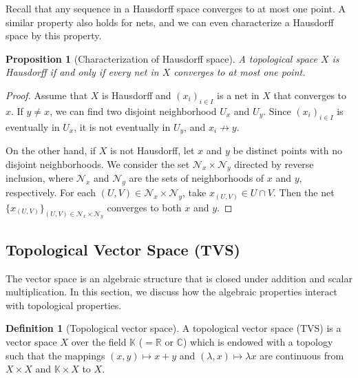 \documentclass{article}
\numberwithin{equation}{section}
\newcommand{\bbC}{\mathbb{C}}
\newcommand{\bbR}{\mathbb{R}}
\theoremstyle{plain}
\newtheorem{proposition}[theorem]{Proposition}
\theoremstyle{definition}
\newtheorem{definition}[theorem]{Definition}
\begin{document}
Recall that any sequence in a Hausdorff space converges to at most one point. A similar property also holds for nets, and we can even characterize a Hausdorff space by this property.
\begin{proposition}[Characterization of Hausdorff space]
A topological space $X$ is Hausdorff if and only if every net in $X$ converges to at most one point.
\end{proposition}
\begin{proof}
Assume that $X$ is Hausdorff and $(x_i)_{i\in I}$ is a net in $X$ that converges to $x$. If $y\neq x$, we can find two disjoint neighborhood $U_x$ and $U_y$. Since $(x_i)_{i\in I}$ is eventually in $U_x$, it is not eventually in $U_y$, and $x_i\not\to y$.

On the other hand, if $X$ is not Hausdorff, let $x$ and $y$ be distinct points with no disjoint neighborhoods. We consider the set $\mathscr{N}_x\times\mathscr{N}_y$ directed by reverse inclusion, where $\mathscr{N}_x$ and $\mathscr{N}_y$ are the sets of neighborhoods of $x$ and $y$, respectively. For each $(U,V)\in\mathscr{N}_x\times\mathscr{N}_y$, take $x_{(U,V)}\in U\cap V$. Then the net $\{x_{(U,V)}\}_{(U,V)\in\mathscr{N}_x\times\mathscr{N}_y}$ converges to both $x$ and $y$.
\end{proof}

\subsection{Topological Vector Space (TVS)}
The vector space is an algebraic structure that is closed under addition and scalar multiplication. In this section, we discuss how the algebraic properties interact with topological properties.
\begin{definition}[Topological vector space]
A topological vector space (TVS) is a vector space $X$ over the field $\mathbb{K}$ ($=\bbR$ or $\bbC$) which is endowed with a topology such that the mappings $(x,y)\mapsto x+y$ and $(\lambda,x)\mapsto \lambda x$ are continuous from $X\times X$ and $\mathbb{K}\times X$ to $X$.
\end{definition}
\end{document}
